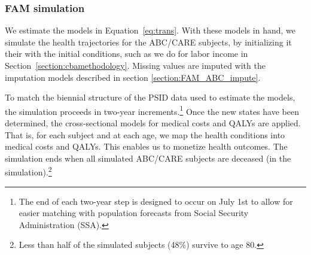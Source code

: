 %
%


\subsubsection{FAM simulation}
\label{appendix:health-fam-simulation}

\noindent We estimate the models in Equation~\eqref{eq:trans}. With these models in hand, we simulate the health trajectories for the ABC/CARE subjects, by initializing it their with the initial conditions, such as we do for labor income in Section~\ref{section:cbamethodology}. Missing values are imputed with the imputation models described in section \ref{section:FAM_ABC_impute}.

\noindent To match the biennial structure of the PSID data used to estimate the models, the simulation proceeds in two-year increments.\footnote{The end of each two-year step is designed to occur on July 1st to allow for easier matching with population forecasts from Social Security Administration (SSA).}
Once the new states have been determined, the cross-sectional models for medical costs and QALYs are applied. That is, for each subject and at each age, we map the health conditions into medical costs and QALYs. This enables us to monetize health outcomes. The simulation ends when all simulated ABC/CARE subjects are deceased (in the simulation).\footnote{Less than half of the simulated subjects (48\%) survive to age 80.}

